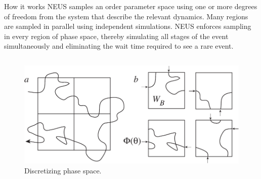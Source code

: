 \documentclass[final]{beamer}
\begin{document}
\begin{columns}[t]
\begin{column}{.33 \linewidth}
	\begin{block}{\Large How it works}\large
            NEUS samples an order parameter space using one or more degrees of freedom from the system that describe the relevant dynamics.  Many regions are sampled in parallel using independent simulations.   NEUS enforces sampling in every region of phase space, thereby simulating all stages of the event simultaneously and eliminating the wait time required to see a rare event.
            \begin{columns}[t]
                \begin{column}{.6\linewidth}
                    \centering
                    \begin{figure}
                        \includegraphics[scale=1.2]{images/motivation2.pdf}
                        \caption{Discretizing phase space.}
                    \end{figure}
                \end{column}
\end{columns}
\end{block}
\end{column}
\end{columns}
\end{document}
